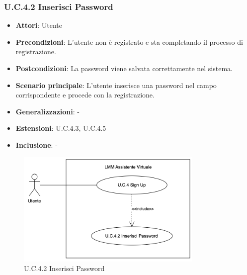 \subsubsection{U.C.4.2 Inserisci Password}
\begin{itemize}
    \item \textbf{Attori}: Utente
    \item \textbf{Precondizioni}: L'utente non è registrato e sta completando il processo di registrazione.
    \item \textbf{Postcondizioni}: La password viene salvata correttamente nel sistema. 
    \item \textbf{Scenario principale}: L'utente inserisce una password nel campo corrispondente e procede con la registrazione. 
    \item \textbf{Generalizzazioni}: -
    \item \textbf{Estensioni}: U.C.4.3, U.C.4.5
    \item \textbf{Inclusione}: -
\end{itemize}
\begin{figure}[H]
    \centering
    \includegraphics[width=0.8\textwidth]{img/U.C.4.2.png}
    \caption{U.C.4.2 Inserisci Password}
\end{figure}
\newpage

